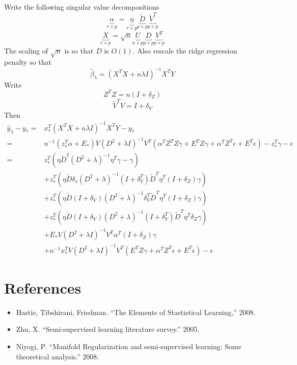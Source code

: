 \documentclass[11pt]{article}
\begin{document}
Write the following singular value decompositions
\[
\underbrace{\alpha}_{r \times p} = \underbrace{\eta}_{r \times p} \underbrace{\tilde{D}}_{p \times p} \underbrace{\tilde{V}^T}_{p \times p}
\]
\[
\underbrace{X}_{r \times p} =\sqrt{n} \underbrace{U}_{n \times p}\underbrace{D}_{p \times p}\underbrace{V^T}_{p \times p}
\]
The scaling of $\sqrt{n}$ is so that $D$ is $O(1)$.
Also rescale the ridge regression penalty so that
\[
\hat{\beta}_\lambda = (X^T X + n \lambda I)^{-1} X^T Y
\]
Write
\[
Z^TZ = n (I + \delta_Z)
\]
\[
\tilde{V}^T V  = I +  \delta_V
\]
Then
\begin{align*}
\hat{y}_\lambda - y_* =&
x_*^T (X^T X + n \lambda I)^{-1} X^T Y - y_*\\
=& n^{-1} (z_*^T \alpha + E_*) V ( D^2 +\lambda I)^{-1} V^T (\alpha^T Z^T Z \gamma + E^T Z\gamma + \alpha^T Z^T \epsilon + E^T \epsilon) - z_*^T \gamma - \epsilon
\\=& z_*^T (\eta \tilde{D}^2 (D^2 + \lambda)^{-1} \eta^T \gamma - \gamma)
\\&+ z_*^T(\eta \tilde{D} \delta_v (D^2 + \lambda)^{-1} (I + \delta_V^T) \tilde{D}^T \eta^T (I + \delta_Z) \gamma)
\\&+ z_*^T(\eta \tilde{D} (I + \delta_V) (D^2 + \lambda)^{-1} \delta_V^T \tilde{D}^T \eta^T (I + \delta_Z) \gamma)
\\&+ z_*^T(\eta \tilde{D} (I + \delta_V) (D^2 + \lambda)^{-1} (I + \delta_V^T) \tilde{D}^T \eta^T \delta_Z \gamma)
\\&+ E_* V (D^2 +\lambda I)^{-1} V^T \alpha^T (I + \delta_Z) \gamma
\\&+ n^{-1} x_*^T V (D^2 +\lambda I)^{-1} V^T (E^T Z\gamma + \alpha^T Z^T \epsilon + E^T \epsilon)  - \epsilon
\end{align*}

\section{References}

\begin{itemize}
\item Hastie, Tibshirani, Friedman.  ``The Elements of Stastistical Learning,'' 2008.
\item Zhu, X.  ``Semi-supervised learning literature survey.'' 2005.
\item Niyogi, P.  ``Manifold Regularization and semi-supervised learning:
Some theoretical analysis.''  2008.
\end{itemize}
\end{document}
